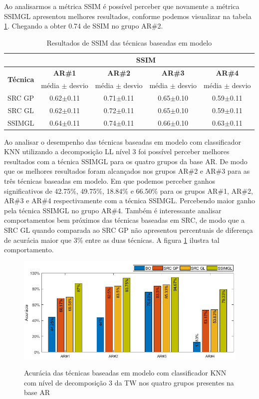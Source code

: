 Ao analisarmos a métrica SSIM é possível perceber que novamente a métrica SSIMGL apresentou melhores resultados, conforme podemos visualizar na tabela \ref{tab:SSIM_modelo}. Chegando a obter 0.74 de SSIM no grupo AR\#2.


\begin{table}[H]
\caption{Resultados de SSIM das técnicas baseadas em modelo}
\centering
\begin{tabular}{|c|c|c|c|c|}
\cline{2-5}
 \multicolumn{1}{c|}{} & \multicolumn{4}{c|}{\textbf{SSIM}}\\ \hline
\multicolumn{1}{|c|}{\multirow{2}{*}{\textbf{Técnica} }}& \textbf{AR\#1} &  \textbf{AR\#2} & \textbf{AR\#3} & \textbf{AR\#4 }  \\ \cline{2-5}
& média $\pm$ desvio & média $\pm$ desvio & média $\pm$ desvio & média $\pm$ desvio \\\hline 
SRC GP&	0.62$\pm$0.11	&0.71$\pm$0.11&	0.65$\pm$0.10&	0.59$\pm$0.11\\\hline
SRC GL&	0.62$\pm$0.11	&0.72$\pm$0.11&	0.65$\pm$0.10&	0.59$\pm$0.11\\\hline
SSIMGL&	0.64$\pm$0.11	&0.74$\pm$0.11&	0.66$\pm$0.10&	0.63$\pm$0.11\\\hline
\end{tabular}
\label{tab:SSIM_modelo}
\end{table}


Ao analisar o desempenho das técnicas baseadas em modelo com classificador KNN utilizando a decomposição LL nível 3 foi possível perceber melhores resultados com a técnica SSIMGL para os quatro grupos da base AR. De modo que os melhores resultados foram alcançados nos grupos AR\#2 e AR\#3 para as três técnicas baseadas em modelo. Em que podemos perceber ganhos significativos de 42.75\%, 49.75\%, 18.84\% e 66.50\% para os grupos AR\#1, AR\#2, AR\#3 e AR\#4 respectivamente com a técnica SSIMGL. Percebendo maior ganho pela técnica SSIMGL no grupo AR\#4. Também é interessante analisar comportamentos bem próximos das técnicas baseadas em SRC, de modo que a SRC GL quando comparada ao SRC GP não apresentou percentuais de diferença de acurácia maior que 3\% entre as duas técnicas. A figura \ref{fig:acuracia_modelo_KNN} ilustra tal comportamento.


\begin{figure}[H]
\centering
\caption{Acurácia das técnicas baseadas em modelo com classificador KNN com nível de decomposição 3 da TW nos quatro grupos presentes na base AR}
\includegraphics[scale=0.52]{imgs4/acuracia_modelo_KNN}
\label{fig:acuracia_modelo_KNN}
\end{figure}

